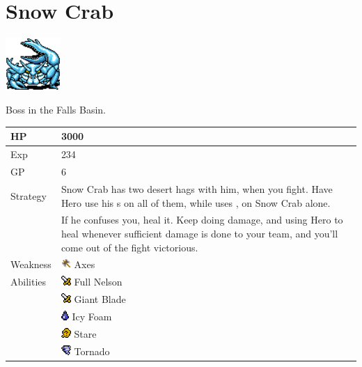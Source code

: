 \section{Snow Crab}
\label{monster:snow_crab}

\includegraphics[height=2cm,keepaspectratio]{./resources/monster/snow_crab}

Boss in the Falls Basin.

\begin{longtable}{ l p{9cm} }
	HP
	& 3000
\\ \hline
	Exp
	& 234
\\ \hline
	GP
	& 6
\\ \hline
	Strategy
	& Snow Crab has two desert hags with him, when you fight. Have Hero use his \nameref{weapon:bomb}s on all of them, while \nameref{char:phoebe} uses \nameref{spell:thunder}, on Snow Crab alone. \\
	& If he confuses you, heal it. Keep doing damage, and using Hero to heal whenever sufficient damage is done to your team, and you'll come out of the fight victorious.
\\ \hline
	Weakness
	& \includegraphics[height=1em,keepaspectratio]{./resources/effects/axe} Axes
\\ \hline
	Abilities
	& \includegraphics[height=1em,keepaspectratio]{./resources/effects/damage} Full Nelson \\
	& \includegraphics[height=1em,keepaspectratio]{./resources/effects/damage} Giant Blade \\
	& \includegraphics[height=1em,keepaspectratio]{./resources/effects/water} Icy Foam \\
	& \includegraphics[height=1em,keepaspectratio]{./resources/effects/confusion} Stare \\
	& \includegraphics[height=1em,keepaspectratio]{./resources/effects/wind} Tornado
\end{longtable}
